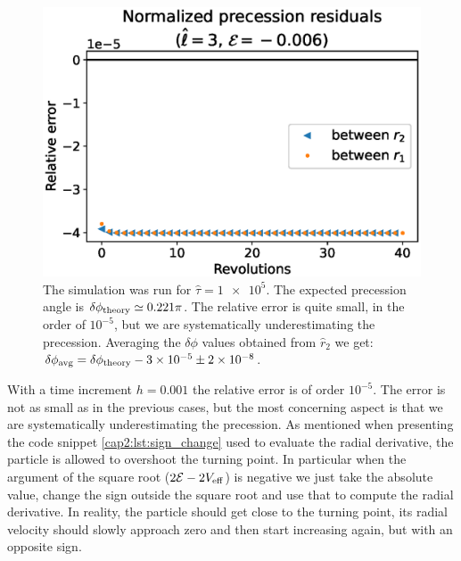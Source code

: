 \begin{figure}[h]
\begin{minipage}{0.48 \textwidth}
        \includegraphics[width=\textwidth]{Figures/chapter2/prec2_res.eps}
        \caption{The simulation was run for $\hat \tau = \num{1e5}$.
        The expected precession angle is $\delta \phi_{\rm theory} \simeq 0.221
        \pi$.
        The relative error is quite small, in the order of $10^{-5}$, but we are
        systematically underestimating the precession.
        Averaging the $\delta \phi$ values obtained from $\hat r_2$ we get: \\
        $\delta \phi_{\rm avg} = \delta \phi_{\rm theory} - \num{3e-5} \pm \num{2e-8}$.}
        \label{cap2:fig:prec2_res}
    \end{minipage}
\end{figure}

With a time increment $h = 0.001$ the relative error is of order $10^{-5}$.
The error is not as small as in the previous cases, but the most concerning
aspect is that we are systematically underestimating the precession.
As mentioned when presenting the code snippet \ref{cap2:lst:sign_change} used to
evaluate the radial derivative, the particle is allowed to overshoot the turning
point.
In particular when the argument of the square root ($2 \mathcal E
- 2 V_{\rm eff}$) is negative we just take the absolute value, change the sign
outside the square root and use that to compute the radial derivative.
In reality, the particle should get close to the turning point, its radial
velocity should slowly approach zero and then start increasing again, but with
an opposite sign.

